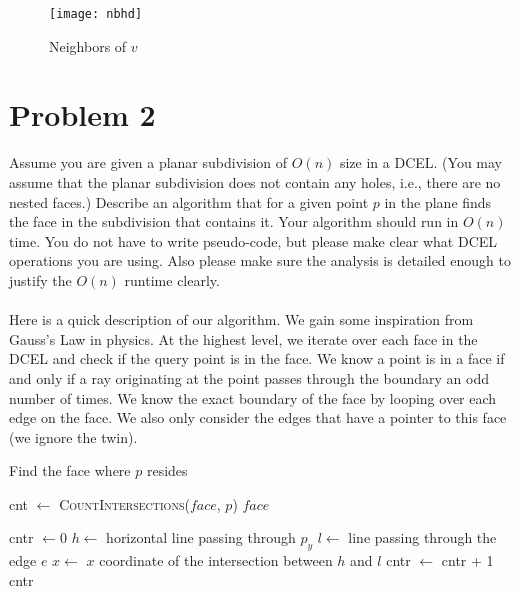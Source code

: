 \documentclass[11pt]{article}
\begin{document}
\begin{figure}[h]
   \centering
   \texttt{[image: nbhd]}
   \caption{Neighbors of $v$}
   \label{fig:neighbors}
\end{figure}

\newpage
\section*{Problem 2}

Assume you are given a planar subdivision of $O(n)$ size in a DCEL. (You may
assume that the planar subdivision does not contain any holes, i.e., there are
no nested faces.) Describe an algorithm that for a given point $p$ in the plane
finds the face in the subdivision that contains it. Your algorithm should run in
$O(n)$ time. You do not have to write pseudo-code, but please make clear what
DCEL operations you are using. Also please make sure the analysis is detailed
enough to justify the $O(n)$ runtime clearly. \\\\
\answer
Here is a quick description of our algorithm.
We gain some inspiration from Gauss's Law in physics.
At the highest level, we iterate over each face in the DCEL and check if the query point is in the face.
We know a point is in a face if and only if a ray originating at the point passes through the boundary an odd number of times.
We know the exact boundary of the face by looping over each edge on the face.
We also only consider the edges that have a pointer to this face (we ignore the twin).

\begin{algorithm}
\caption{Find the face where $p$ resides}
    \label{alg:findface}
    \begin{algorithmic}[1]
            \State cnt $\gets$ \textsc{CountIntersections}($face$, $p$)
                \State \Return $face$
            \EndIf
        \EndFor
    \EndFunction
    \end{algorithmic}

    \begin{algorithmic}[1]
        \State cntr $\gets 0$
        \State $h \gets$ horizontal line passing through $p_y$
            \State $l \gets$ line passing through the edge $e$
            \State $x \gets$ $x$ coordinate of the intersection between $h$ and $l$
                \State cntr $\gets$ cntr + 1
            \EndIf
        \EndFor
        \State \Return cntr
    \EndFunction
    \end{algorithmic}
\end{algorithm}
\end{document}
